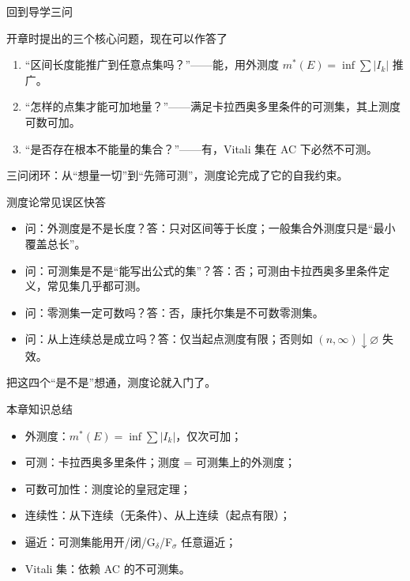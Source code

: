 \documentclass[aspectratio=169,11pt]{ctexbeamer}
\begin{document}
\begin{frame}{回到导学三问}
  \begin{block}{开章时提出的三个核心问题，现在可以作答了}
    \begin{enumerate}
      \item “区间长度能推广到任意点集吗？”——能，用\alert{外测度} $m^{*}(E)=\inf\sum|I_k|$ 推广。
      \item “怎样的点集才能可加地量？”——满足\alert{卡拉西奥多里条件}的\alert{可测集}，其上测度可数可加。
      \item “是否存在根本不能量的集合？”——有，\alert{Vitali 集}在 AC 下必然不可测。
    \end{enumerate}
  \end{block}
  \begin{center}
    \color{clouddeep}\small 三问闭环：从“想量一切”到“先筛可测”，测度论完成了它的自我约束。
  \end{center}
\end{frame}

\begin{frame}{测度论常见误区快答}
  \begin{itemize}
    \item \alert{问}：外测度是不是长度？\quad \alert{答}：只对区间等于长度；一般集合外测度只是“最小覆盖总长”。
    \item \alert{问}：可测集是不是“能写出公式的集”？\quad \alert{答}：否；可测由卡拉西奥多里条件定义，常见集几乎都可测。
    \item \alert{问}：零测集一定可数吗？\quad \alert{答}：否，康托尔集是不可数零测集。
    \item \alert{问}：从上连续总是成立吗？\quad \alert{答}：仅当起点测度有限；否则如 $(n,\infty)\downarrow\varnothing$ 失效。
  \end{itemize}
  \begin{center}
    \color{cloudgray}\small 把这四个“是不是”想通，测度论就入门了。
  \end{center}
\end{frame}

\begin{frame}{本章知识总结}
  \begin{itemize}
    \item \alert{外测度}：$m^{*}(E)=\inf\sum|I_k|$，仅次可加；
    \item \alert{可测}：卡拉西奥多里条件；测度 = 可测集上的外测度；
    \item \alert{可数可加性}：测度论的皇冠定理；
    \item \alert{连续性}：从下连续（无条件）、从上连续（起点有限）；
    \item \alert{逼近}：可测集能用开/闭/G$_\delta$/F$_\sigma$ 任意逼近；
    \item \alert{Vitali 集}：依赖 AC 的不可测集。
  \end{itemize}
\end{frame}
\end{document}
